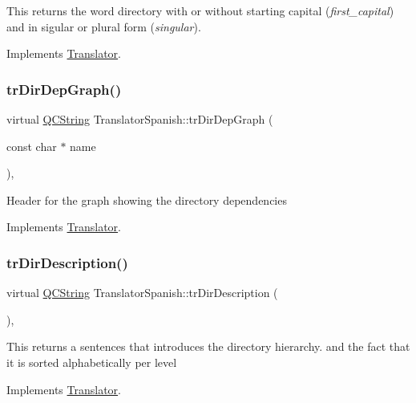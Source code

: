 This returns the word directory with or without starting capital ({\itshape first\+\_\+capital}) and in sigular or plural form ({\itshape singular}). 

Implements \mbox{\hyperlink{class_translator}{Translator}}.

\mbox{\label{class_translator_spanish_a712ebacbed636b04e4789b7cedce889e}} 
\subsubsection{\texorpdfstring{trDirDepGraph()}{trDirDepGraph()}}
{\footnotesize\ttfamily virtual \mbox{\hyperlink{class_q_c_string}{Q\+C\+String}} Translator\+Spanish\+::tr\+Dir\+Dep\+Graph (\begin{DoxyParamCaption}\item[{const char $\ast$}]{name }\end{DoxyParamCaption})\hspace{0.3cm}{\ttfamily [inline]}, {\ttfamily [virtual]}}

Header for the graph showing the directory dependencies 

Implements \mbox{\hyperlink{class_translator}{Translator}}.

\mbox{\label{class_translator_spanish_a86b7d602ef0da1096f800c4926fe2bf8}} 
\subsubsection{\texorpdfstring{trDirDescription()}{trDirDescription()}}
{\footnotesize\ttfamily virtual \mbox{\hyperlink{class_q_c_string}{Q\+C\+String}} Translator\+Spanish\+::tr\+Dir\+Description (\begin{DoxyParamCaption}{ }\end{DoxyParamCaption})\hspace{0.3cm}{\ttfamily [inline]}, {\ttfamily [virtual]}}

This returns a sentences that introduces the directory hierarchy. and the fact that it is sorted alphabetically per level 

Implements \mbox{\hyperlink{class_translator}{Translator}}.

